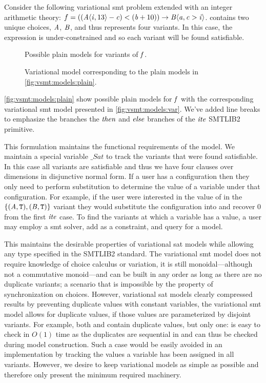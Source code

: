 Consider the following variational \ac{smt} problem extended with an integer
arithmetic theory: $f = ((\chc[A]{\iV{}, 13} - \cV{}) < (\bV + 10)) \rightarrow
\chc[B]{\aV{}, \cV{} > \iV{}}$. \fV{} contains two unique choices, $\mathit{A}$,
$\mathit{B}$, and thus represents four variants. In this case, the expression is
under-constrained and so each variant will be found satisfiable.
% 
\begin{figure}[h]
  \centering
  
  \caption{Possible plain models for variants of $\mathit{f}$.}%
  \label{fig:vsmt:models:plain}
\end{figure}
\begin{figure}[h]
  \centering
  
  \caption{Variational model corresponding to the plain models in
    \autoref{fig:vsmt:models:plain}.}%
  \label{fig:vsmt:models:var}
\end{figure}

\autoref{fig:vsmt:models:plain} show possible plain models for $\mathit{f}$ with the
corresponding variational \ac{smt} model presented in
\autoref{fig:vsmt:models:var}. We've added line breaks to emphasize the branches
the $\mathit{then}$ and $\mathit{else}$ branches of the $\mathit{ite}$ SMTLIB2 primitive.

This formulation maintains the functional requirements of the model. We maintain
a special variable $\_Sat$ to track the variants that were found satisfiable. In
this case all variants are satisfiable and thus we have four clauses over
dimensions in disjunctive normal form. If a user has a configuration then they
only need to perform substitution to determine the value of a variable under
that configuration. For example, if the user were interested in the value of
\iV{} in the $\{(\mathit{A}{}, \texttt{T}{}), (\mathit{B}{}, \texttt{T}{})\}$ variant they would
substitute the configuration into \vc{\iV{}} and recover 0 from the first
$\mathit{ite}$ case. To find the variants at which a variable has a value, a user
may employ a \ac{smt} solver, add \vc{\iV{}} as a constraint, and query for a
model.

This maintains the desirable properties of variational \ac{sat} models while
allowing any type specified in the SMTLIB2 standard. The variational \ac{smt}
model does not require knowledge of choice calculus or variation, it is still
monoidal---although not a commutative monoid---and can be built in any order as
long as there are no duplicate variants; a scenario that is impossible by the
property of synchronization on choices. However, variational \ac{sat} models
clearly compressed results by preventing duplicate values with constant
variables, the variational \ac{smt} model allows for duplicate values, if those
values are parameterized by disjoint variants. For example, both \iV{} and \cV{}
contain duplicate values, but only one: \iV{} is easy to check in $O(1)$ time as
the duplicates are sequential in \vc{\iV{}} and can thus be checked during model
construction. Such a case would be easily avoided in an implementation by
tracking the values a variable has been assigned in all variants. However, we
desire to keep variational models as simple as possible and therefore only
present the minimum required machinery.


